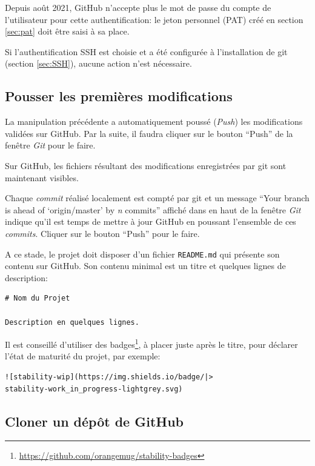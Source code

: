 \documentclass[
  12pt,
  french,
  a4paper,
  extrafontsizes,onecolumn,openright
  ]{memoir}
\begin{document}
\normalsize

Depuis août 2021, GitHub n'accepte plus le mot de passe du compte de l'utilisateur pour cette authentification: le jeton personnel (PAT) créé en section \ref{sec:pat} doit être saisi à sa place.

Si l'authentification SSH est choisie et a été configurée à l'installation de git (section \ref{sec:SSH}), aucune action n'est nécessaire.

\subsection{Pousser les premières modifications}\label{pousser-les-premiuxe8res-modifications}

La manipulation précédente a automatiquement poussé (\emph{Push}) les modifications validées sur GitHub.
Par la suite, il faudra cliquer sur le bouton \enquote{Push} de la fenêtre \emph{Git} pour le faire.

Sur GitHub, les fichiers résultant des modifications enregistrées par git sont maintenant visibles.

Chaque \emph{commit} réalisé localement est compté par git et un message \enquote{Your branch is ahead of \enquote*{origin/master} by \emph{n} commits} affiché dans en haut de la fenêtre \emph{Git} indique qu'il est temps de mettre à jour GitHub en poussant l'ensemble de ces \emph{commits}.
Cliquer sur le bouton \enquote{Push} pour le faire.

A ce stade, le projet doit disposer d'un fichier \texttt{README.md} qui présente son contenu sur GitHub.
Son contenu minimal est un titre et quelques lignes de description:

\begin{verbatim}
# Nom du Projet

Description en quelques lignes.
\end{verbatim}

Il est conseillé d'utiliser des badges\footnote{\url{https://github.com/orangemug/stability-badges}}, à placer juste après le titre, pour déclarer l'état de maturité du projet, par exemple:

\begin{verbatim}
![stability-wip](https://img.shields.io/badge/|>
stability-work_in_progress-lightgrey.svg)
\end{verbatim}

\subsection{Cloner un dépôt de GitHub}\label{cloner-un-duxe9puxf4t-de-github}
\end{document}

